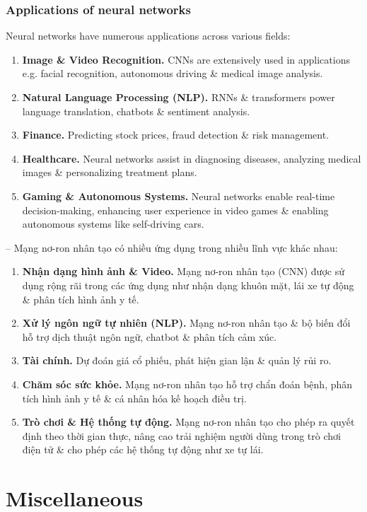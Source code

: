 \documentclass{article}
\begin{document}
\subsubsection{Applications of neural networks}
Neural networks have numerous applications across various fields:
\begin{enumerate}
    \item {\bf Image \& Video Recognition.} CNNs are extensively used in applications e.g. facial recognition, autonomous driving \& medical image analysis.
    \item {\bf Natural Language Processing (NLP).} RNNs \& transformers power language translation, chatbots \& sentiment analysis.
    \item {\bf Finance.} Predicting stock prices, fraud detection \& risk management.
    \item {\bf Healthcare.} Neural networks assist in diagnosing diseases, analyzing medical images \& personalizing treatment plans.
    \item {\bf Gaming \& Autonomous Systems.} Neural networks enable real-time decision-making, enhancing user experience in video games \& enabling autonomous systems like self-driving cars.
\end{enumerate}
-- Mạng nơ-ron nhân tạo có nhiều ứng dụng trong nhiều lĩnh vực khác nhau:
\begin{enumerate}
    \item {\bf Nhận dạng hình ảnh \& Video.} Mạng nơ-ron nhân tạo (CNN) được sử dụng rộng rãi trong các ứng dụng như nhận dạng khuôn mặt, lái xe tự động \& phân tích hình ảnh y tế.
    \item {\bf Xử lý ngôn ngữ tự nhiên (NLP).} Mạng nơ-ron nhân tạo \& bộ biến đổi hỗ trợ dịch thuật ngôn ngữ, chatbot \& phân tích cảm xúc.
    \item {\bf Tài chính.} Dự đoán giá cổ phiếu, phát hiện gian lận \& quản lý rủi ro.
    \item {\bf Chăm sóc sức khỏe.} Mạng nơ-ron nhân tạo hỗ trợ chẩn đoán bệnh, phân tích hình ảnh y tế \& cá nhân hóa kế hoạch điều trị.
    \item {\bf Trò chơi \& Hệ thống tự động.} Mạng nơ-ron nhân tạo cho phép ra quyết định theo thời gian thực, nâng cao trải nghiệm người dùng trong trò chơi điện tử \& cho phép các hệ thống tự động như xe tự lái.
\end{enumerate}


\section{Miscellaneous}


\printbibliography[heading=bibintoc]
\end{document}
